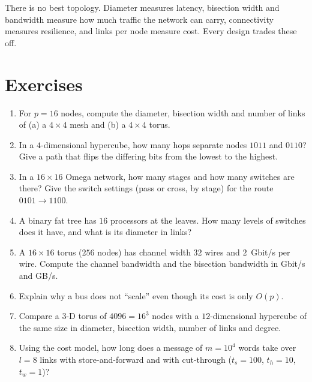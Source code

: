 \begin{keyidea}
There is no best topology. Diameter measures latency, bisection width and bandwidth measure how much traffic the network can carry, connectivity measures resilience, and links per node
measure cost. Every design trades these off.
\end{keyidea}

\section*{Exercises}
\begin{enumerate}[label=\textbf{\thechapter.\arabic*},leftmargin=*]
  \item For $p=16$ nodes, compute the diameter, bisection width and number of links of (a) a $4\times4$ mesh and (b) a $4\times4$ torus.
  \item In a $4$-dimensional hypercube, how many hops separate nodes $1011$ and $0110$? Give a path that flips the differing bits from the lowest to the highest.
  \item In a $16\times16$ Omega network, how many stages and how many switches are there? Give the switch settings (pass or cross, by stage) for the route $0101\to1100$.
  \item A binary fat tree has $16$ processors at the leaves. How many levels of switches does it have, and what is its diameter in links?
  \item A $16\times16$ torus ($256$ nodes) has channel width $32$ wires and $2$~Gbit/s per wire. Compute the channel bandwidth and the bisection bandwidth in Gbit/s and GB/s.
  \item Explain why a bus does not ``scale'' even though its cost is only $O(p)$.
  \item Compare a 3-D torus of $4096=16^3$ nodes with a $12$-dimensional hypercube of the same size in diameter, bisection width, number of links and degree.
  \item Using the cost model, how long does a message of $m=10^{4}$ words take over $l=8$ links with store-and-forward and with cut-through ($t_s=100$, $t_h=10$, $t_w=1$)?
\end{enumerate}